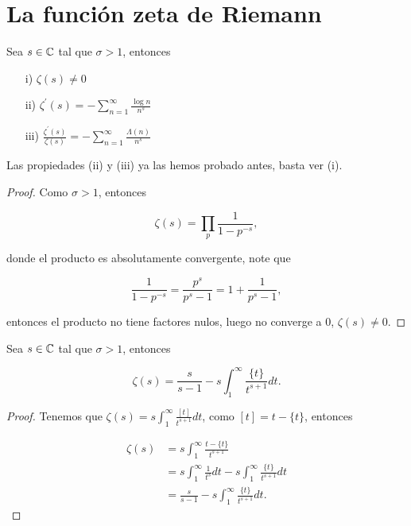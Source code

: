 \section{La función zeta de Riemann}

\begin{theorem}[Propiedades]
Sea $s\in\mathbb{C}$ tal que $\sigma>1$, entonces

\begin{itemize}[]
\item[i)] $\zeta(s)\neq 0$
\item[ii)] $\displaystyle\zeta^{\prime}(s)=-\sum_{n=1}^{\infty} \frac{\log n}{n^s}$
\item[iii)] $\displaystyle\frac{\zeta^{\prime}(s)}{\zeta(s)}=-\sum_{n=1}^{\infty} \frac{\Lambda(n)}{n^s}$
\end{itemize}
\end{theorem}

Las propiedades (ii) y (iii) ya las hemos probado antes, basta ver (i).\\

\begin{proof}
Como $\sigma>1$, entonces

$$\zeta(s)=\prod_p  \frac{1}{1-p^{-s}},$$

donde el producto es absolutamente convergente, note que

$$\frac{1}{1-p^{-s}}=\frac{p^s}{p^s-1}=1+\frac{1}{p^s-1},$$

entonces el producto no tiene factores nulos, luego no converge a 0, $\zeta(s)\neq 0$.
\end{proof}

\begin{theorem}
Sea $s\in \mathbb{C}$ tal que $\sigma>1$, entonces

$$\zeta(s)=\frac{s}{s-1}-s\int_1^{\infty}\frac{\{t\}}{t^{s+1}}dt.$$
\end{theorem}

\begin{proof}
Tenemos que $\zeta(s)=\displaystyle s\int_1^{\infty}\frac{[t]}{t^{s+1}}dt$, como $[t]=t-\{t\}$, entonces

\begin{align*}
\zeta(s)&=s\int_1^{\infty}\frac{t-\{t\}}{t^{s+1}}\\
&=s\int_1^{\infty}\frac{1}{t^s}dt-s\int_1^{\infty}\frac{\{t\}}{t^{s+1}}dt\\
&=\frac{s}{s-1}-s\int_1^{\infty}\frac{\{t\}}{t^{s+1}}dt.
\end{align*}
\end{proof}

